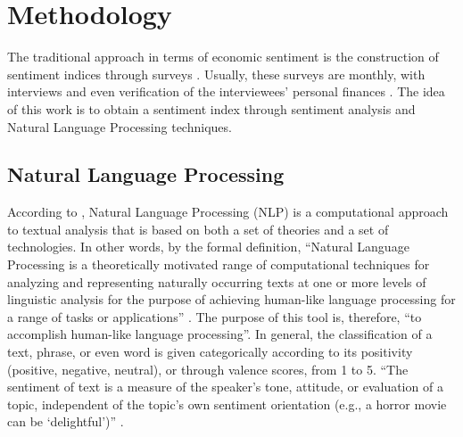 \chapter{\textbf{Methodology}} \label{cap:methodology}

The traditional approach in terms of economic sentiment is the construction of sentiment indices through surveys \cite[p. 4]{shapiro2020measuring}. Usually, these surveys are monthly, with interviews and even verification of the interviewees' personal finances \cite[p. 5]{shapiro2020measuring}. The idea of this work is to obtain a sentiment index through sentiment analysis and Natural Language Processing techniques.

\section{Natural Language Processing}

According to \cite{liddy2001natural}, Natural Language Processing (NLP) is a computational approach to textual analysis that is based on both a set of theories and a set of technologies. In other words, by the formal definition, ``Natural Language Processing is a theoretically motivated range of computational techniques for analyzing and representing naturally occurring texts at one or more levels of linguistic analysis for the purpose of achieving human-like language processing for a range of tasks or applications'' \cite[p. 2]{liddy2001natural}. The purpose of this tool is, therefore, ``to accomplish human-like language processing''. In general, the classification of a text, phrase, or even word is given categorically according to its positivity (positive, negative, neutral), or through valence scores, from 1 to 5. ``The sentiment of text is a measure of the speaker's tone, attitude, or evaluation of a topic, independent of the topic's own sentiment orientation (e.g., a horror movie can be `delightful')'' \cite[p. 5]{shapiro2020measuring}.\\

